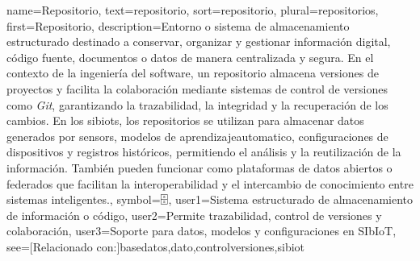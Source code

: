 	{
		name={Repositorio},
		text={repositorio},
		sort={repositorio},
		plural={repositorios},
		first={Repositorio},
		description={Entorno o sistema de almacenamiento estructurado destinado a conservar, organizar y gestionar informaci{\'o}n digital, c{\'o}digo fuente, documentos o datos de manera centralizada y segura. 
			En el contexto de la ingenier{\'i}a del software, un repositorio almacena versiones de proyectos y facilita la colaboraci{\'o}n mediante sistemas de control de versiones como \textit{Git}, garantizando la trazabilidad, la integridad y la recuperaci{\'o}n de los cambios. 
			En los \glspl{sibiot}, los repositorios se utilizan para almacenar datos generados por \glspl{sensor}, modelos de \gls{aprendizajeautomatico}, configuraciones de \glspl{dispositivo} y registros hist{\'o}ricos, permitiendo el an{\'a}lisis y la reutilizaci{\'o}n de la informaci{\'o}n. 
			Tambi{\'e}n pueden funcionar como plataformas de datos abiertos o federados que facilitan la interoperabilidad y el intercambio de conocimiento entre sistemas inteligentes.},
		symbol={🗄️},
		user1={Sistema estructurado de almacenamiento de informaci{\'o}n o c{\'o}digo},
		user2={Permite trazabilidad, control de versiones y colaboraci{\'o}n},
		user3={Soporte para datos, modelos y configuraciones en SIbIoT},
		see={[Relacionado con:]{basedatos,dato,controlversiones,sibiot}}
	}
	
	
	
